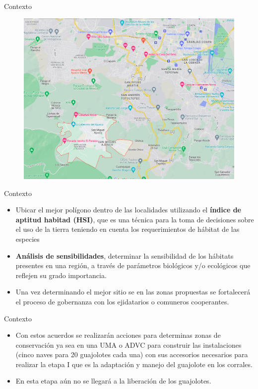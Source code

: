 \documentclass[11pt]{beamer}
\begin{document}
\begin{frame}{Contexto}
	\begin{figure}
		\includegraphics[scale=1]{images/cinturon_verde}
	\end{figure}
\end{frame}

\begin{frame}{Contexto}\small
	\begin{itemize}
		\item Ubicar el mejor polígono dentro de las localidades utilizando el \textbf{índice de aptitud habitad (HSI)}, que es una técnica para la toma de decisiones sobre el uso de la tierra teniendo en cuenta los requerimientos de hábitat de las especies
		\item \textbf{Análisis de sensibilidades}, determinar la sensibilidad de los hábitats presentes en una región, a través de parámetros biológicos y/o ecológicos que reflejen su grado importancia. 	
		\item Una vez determinando el mejor sitio se en las zonas propuestas se fortalecerá el proceso de gobernanza con los ejidatarios o comuneros cooperantes.
	\end{itemize}
\end{frame}

\begin{frame}{Contexto}\small

	\begin{itemize}
		\item Con estos acuerdos se realizarán acciones para determinas zonas de conservación ya sea en una UMA o ADVC para construir las instalaciones (cinco naves para 20 guajolotes cada una) con sus accesorios necesarios para realizar la etapa I que es la adaptación y manejo del guajolote en los corrales. 
		\item En esta etapa aún no se llegará a la liberación de los guajolotes.
	\end{itemize}

\end{frame}
\end{document}
